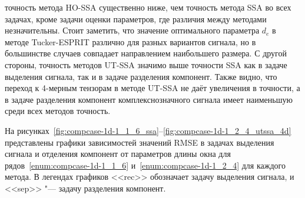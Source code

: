 \documentclass[specialist,
  substylefile = spbu.rtx,
subf,href,colorlinks=true, 12pt]{disser}
\theoremstyle{plain}
\theoremstyle{definition}
\theoremstyle{remark}
\def\newtssa/{UT-SSA}
\begin{document}
точность метода HO-SSA существенно ниже, чем точность метода SSA во
всех задачах, кроме задачи оценки параметров, где различия между
методами незначительны. Стоит заметить, что значение оптимального
параметра $d_e$ в методе Tucker-ESPRIT различно для разных вариантов
сигнала, но в большинстве случаев совпадает направлением наибольшего
размера.
С другой стороны, точность методов \newtssa/ значимо выше точности SSA как в
задаче выделения сигнала, так и в задаче разделения компонент. Также
видно, что переход к 4-мерным тензорам в методе \newtssa/ не даёт
увеличения в точности, а в задаче разделения компонент
комплекснозначного сигнала имеет наименьшую среди всех методов
точность.

На
рисунках~\ref{fig:compcase-1d-1_1_6_ssa}--\ref{fig:compcase-1d-1_2_4_utssa_4d}
представлены графики зависимостей значений RMSE в задачах выделения сигнала и
отделения компонент от параметров длины окна для
рядов~\ref{enum:compcase-1d-1_1_6} и~\ref{enum:compcase-1d-1_2_4} для
каждого метода. В легендах графиков <<rec>> обозначает задачу
выделения сигнала, и <<sep>> "--- задачу разделения компонент.
\end{document}
